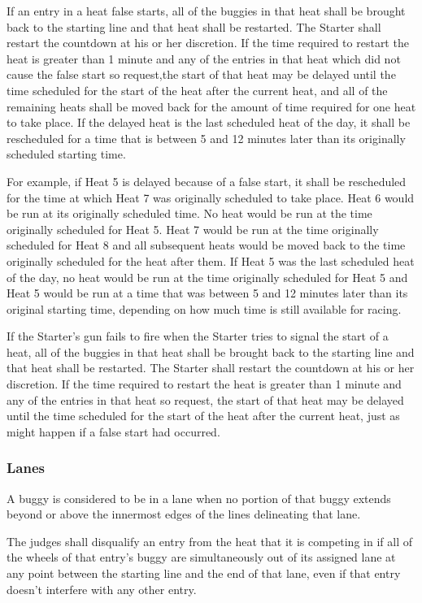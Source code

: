 \documentclass[openany]{book}
\begin{document}
If an entry in a heat false starts, all of the buggies in that heat shall be brought back to the starting line and that heat shall be restarted. The Starter shall restart the countdown at his or her discretion. If the time required to restart the heat is greater than 1 minute and any of the entries in that heat which did not cause the false start so request,the start of that heat may be delayed until the time scheduled for the start of the heat after the current heat, and all of the remaining heats shall be moved back for the amount of time required for one heat to take place. If the delayed heat is the last scheduled heat of the day, it shall be rescheduled for a time that is between 5 and 12 minutes later than its originally scheduled starting time.

For example, if Heat 5 is delayed because of a false start, it shall be rescheduled for the time at which Heat 7 was originally scheduled to take place. Heat 6 would be run at its originally scheduled time. No heat would be run at the time originally scheduled for Heat 5. Heat 7 would be run at the time originally scheduled for Heat 8 and all subsequent heats would be moved back to the time originally scheduled for the heat after them. If Heat 5 was the last scheduled heat of the day, no heat would be run at the time originally scheduled for Heat 5 and Heat 5 would be run at a time that was between 5 and 12 minutes later than its original starting time, depending on how much time is still available for racing.

If the Starter's gun fails to fire when the Starter tries to signal the start of a heat, all of the buggies in that heat shall be brought back to the starting line and that heat shall be restarted. The Starter shall restart the countdown at his or her discretion. If the time required to restart the heat is greater than 1 minute and any of the entries in that heat so request, the start of that heat may be delayed until the time scheduled for the start of the heat after the current heat, just as might happen if a false start had occurred.

\subsubsection{Lanes}

A buggy is considered to be in a lane when no portion of that buggy extends beyond or above the innermost edges of the lines delineating that lane.

The judges shall disqualify an entry from the heat that it is competing in if all of the wheels of that entry's buggy are simultaneously out of its assigned lane at any point between the starting line and the end of that lane, even if that entry doesn't interfere with any other entry.
\end{document}
